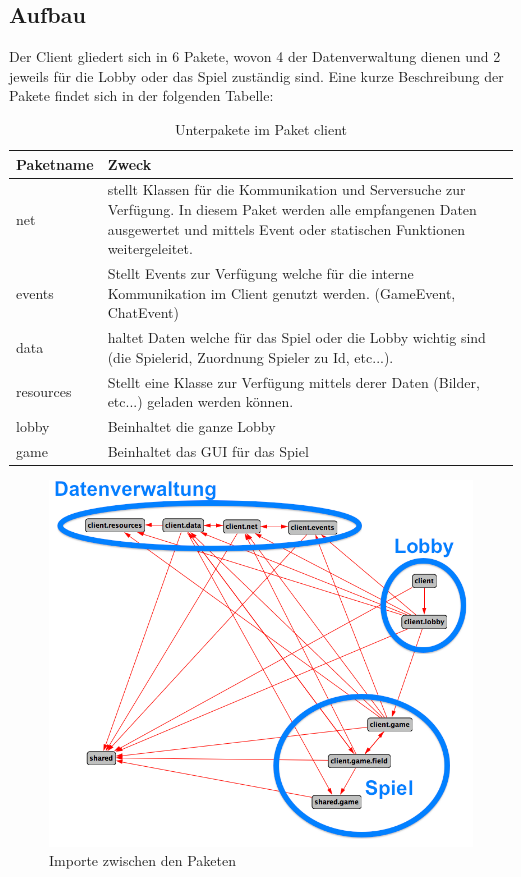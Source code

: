 \documentclass[ngerman, 12pt, pdftex]{scrartcl}[2006/07/30]
\begin{document}
\subsection{Aufbau}
Der Client gliedert sich in 6 Pakete, wovon 4 der Datenverwaltung dienen und 2 jeweils für die Lobby oder das Spiel zuständig sind.
Eine kurze Beschreibung der Pakete findet sich in der folgenden Tabelle:
\begin{table}[h!]
\begin{tabular}{ l p{12cm} }
  Paketname & Zweck \\ \hline
  net &  stellt Klassen für die Kommunikation und Serversuche zur Verfügung. In diesem Paket werden alle empfangenen Daten ausgewertet und mittels Event oder statischen Funktionen weitergeleitet.\\
  events & Stellt Events zur Verfügung welche für die interne Kommunikation im Client genutzt werden. (GameEvent, ChatEvent)\\
  data&  haltet Daten welche für das Spiel oder die Lobby wichtig sind (die Spielerid, Zuordnung Spieler zu Id, etc...).\\
  resources & Stellt eine Klasse zur Verfügung mittels derer Daten (Bilder, etc...) geladen werden können.\\
  lobby & Beinhaltet die ganze Lobby\\
  game & Beinhaltet das GUI für das Spiel\\
\end{tabular}
\caption{Unterpakete im Paket client}
\end{table}
\begin{figure}[h!]
\centering
\includegraphics[scale=0.4]{client/client_aufbau_ann.png}
\caption{Importe zwischen den Paketen}
\end{figure}
\end{document}
